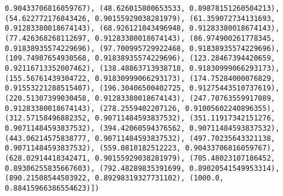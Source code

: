 \documentclass[11pt]{article}
\begin{document}
\begin{Verbatim}[commandchars=\\\{\}]
0.90433706816059767), (48.626015800653533, 0.89878151260504213), (54.622772176843426, 0.90155929038281979), (61.359072734131693, 0.91283380018674143), (68.926121043496948, 0.91283380018674143), (77.426368268112697, 0.91283380018674143), (86.974900261778345, 0.91838935574229696), (97.700995729922468, 0.91838935574229696), (109.74987654930568, 0.91838935574229696), (123.28467394420659, 0.92116713352007462), (138.48863713938718, 0.91830999066293173), (155.56761439304722, 0.91830999066293173), (174.75284000076829, 0.91553221288515407), (196.30406500402725, 0.91275443510737619), (220.51307399030458, 0.91283380018674143), (247.70763559917089, 0.91283380018674143), (278.2559402207126, 0.91005602240896355), (312.57158496882352, 0.90711484593837532), (351.11917342151276, 0.90711484593837532), (394.42060594376562, 0.90711484593837532), (443.06214575838777, 0.90711484593837532), (497.70235643321138, 0.90711484593837532), (559.0810182512223, 0.90433706816059767), (628.02914418342471, 0.90155929038281979), (705.48023107186452, 0.89306255835667603), (792.48289835391699, 0.89020541549953314), (890.21508544503922, 0.89298319327731102), (1000.0, 0.88415966386554623)])

\end{Verbatim}
\end{document}
